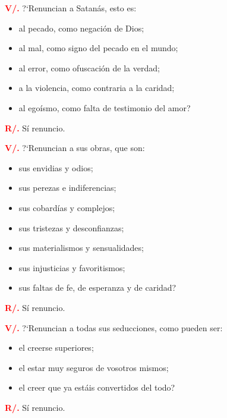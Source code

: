 \documentclass[12pt, letterpaper]{report}
\begin{document}
\noindent
\Large {\bfseries \textcolor{red}{V/.}} \hspace{0.5cm} ?`Renuncian a Satan\'as, esto es:
\begin{itemize}[leftmargin=2.0cm,labelsep=0.5cm]
\item al pecado, como negaci\'on de Dios;
\item al mal, como signo del pecado en el mundo;
\item al error, como ofuscaci\'on de la verdad;
\item a la violencia, como contraria a la caridad;
\item al ego\'ismo, como falta de testimonio del amor?
\end{itemize}

\noindent
\Large {\bfseries \textcolor{red}{R/.}} \hspace{0.5cm} S\'i renuncio. \newline

\noindent
\Large {\bfseries \textcolor{red}{V/.}} \hspace{0.5cm} ?`Renuncian a sus obras, que son:
\begin{itemize}[leftmargin=2.0cm,labelsep=0.5cm]
\item sus envidias y odios;
\item sus perezas e indiferencias;
\item sus cobard\'ias y complejos;
\item sus tristezas y desconfianzas;
\item sus materialismos y sensualidades;
\item sus injusticias y favoritismos;
\item sus faltas de fe, de esperanza y de caridad?
\end{itemize}

\Large {\bfseries \textcolor{red}{R/.}} \hspace{0.5cm} S\'i renuncio. \newline

\newpage

\noindent
\Large {\bfseries \textcolor{red}{V/.}} \hspace{0.5cm} ?`Renuncian a todas sus seducciones, como pueden ser:
\begin{itemize}[leftmargin=2.0cm,labelsep=0.5cm]
\item el creerse superiores;
\item el estar muy seguros de vosotros mismos;
\item el creer que ya est\'ais convertidos del todo?
\end{itemize}
\Large {\bfseries \textcolor{red}{R/.}} \hspace{0.5cm} S\'i renuncio. \newline
\end{document}
